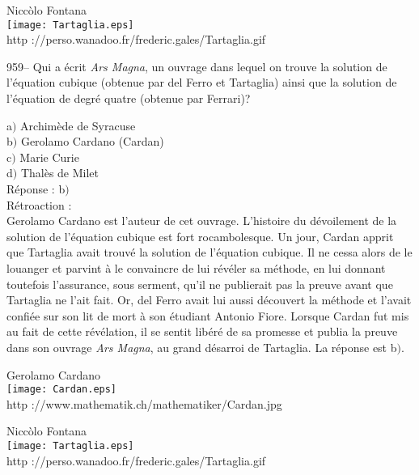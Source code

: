 ﻿\documentclass[letterpaper, 12pt]{article}
\begin{document}
        \begin{center}
        Nicc\`olo Fontana\\
    \texttt{[image: Tartaglia.eps]}\\
        {\footnotesize http
://perso.wanadoo.fr/frederic.gales/Tartaglia.gif}
    \end{center}

959-- Qui a \'ecrit {\sl Ars Magna}, un ouvrage dans lequel on
trouve la solution de l'\'equation cubique (obtenue par del Ferro et
Tartaglia) ainsi que la solution de l'\'equation de degr\'e quatre
(obtenue par Ferrari)?

a$)$ Archim\`ede de Syracuse  \\
b$)$ Gerolamo Cardano (Cardan)  \\
c$)$ Marie Curie  \\
d$)$ Thal\`es de Milet\\

R\'eponse : b$)$\\

R\'etroaction : \\
Gerolamo Cardano est l'auteur de cet ouvrage. L'histoire du
d\'evoilement de la solution de l'\'equation cubique est fort
rocambolesque. Un jour, Cardan apprit que Tartaglia avait trouv\'e
la solution de l'\'equation cubique. Il ne cessa alors de le
louanger et parvint \`a le convaincre de lui r\'ev\'eler sa
m\'ethode, en lui donnant toutefois l'assurance, sous serment, qu'il
ne publierait pas la preuve avant que Tartaglia ne l'ait fait. Or,
del Ferro avait lui aussi d\'ecouvert la m\'ethode et l'avait
confi\'ee sur son lit de mort \`a son \'etudiant Antonio Fiore.
Lorsque Cardan fut mis au fait de cette r\'ev\'elation,
il se sentit lib\'er\'e de sa promesse et publia la preuve dans son ouvrage
{\sl Ars Magna}, au grand d\'esarroi de Tartaglia. La r\'eponse est b$)$.\\

        \begin{center}
        Gerolamo Cardano\\
    \texttt{[image: Cardan.eps]}\\
        {\footnotesize http ://www.mathematik.ch/mathematiker/Cardan.jpg}
    \end{center}

        \begin{center}
        Nicc\`olo Fontana\\
    \texttt{[image: Tartaglia.eps]}\\
        {\footnotesize http
://perso.wanadoo.fr/frederic.gales/Tartaglia.gif}
    \end{center}
\end{document}
